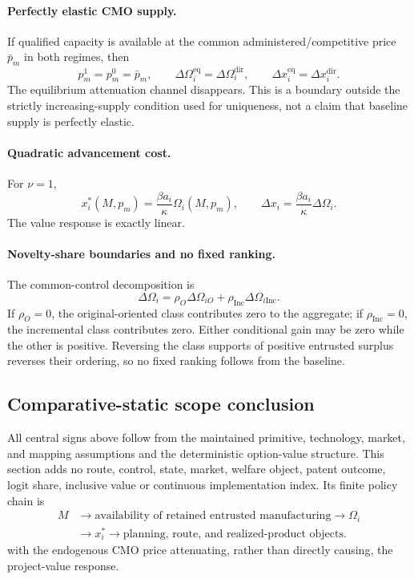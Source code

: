 \paragraph{Perfectly elastic CMO supply.}
If qualified capacity is available at the common administered/competitive
price \(\bar p_m\) in both regimes, then
\[
  p_m^1=p_m^0=\bar p_m,
  \qquad
  \Delta\Omega_i^{\mathrm{eq}}=\Delta\Omega_i^{\mathrm{dir}},
  \qquad
  \Delta x_i^{\mathrm{eq}}=\Delta x_i^{\mathrm{dir}}.
\]
The equilibrium attenuation channel disappears. This is a boundary outside
the strictly increasing-supply condition used for uniqueness, not a claim
that baseline supply is perfectly elastic.

\paragraph{Quadratic advancement cost.}
For \(\nu=1\),
\begin{equation}
  x_i^*(M,p_m)
  =
  \frac{\beta a_i}{\kappa}\Omega_i(M,p_m),
  \qquad
  \Delta x_i
  =
  \frac{\beta a_i}{\kappa}\Delta\Omega_i.
  \label{eq:p15-quadratic-boundary}
\end{equation}
The value response is exactly linear.

\paragraph{Novelty-share boundaries and no fixed ranking.}
The common-control decomposition is
\begin{equation}
  \Delta\Omega_i
  =
  \rho_O\Delta\Omega_{iO}
  +
  \rho_{\mathrm{Inc}}\Delta\Omega_{i\mathrm{Inc}}.
  \label{eq:p15-novelty-boundary}
\end{equation}
If \(\rho_O=0\), the original-oriented class contributes zero to the aggregate;
if \(\rho_{\mathrm{Inc}}=0\), the incremental class contributes zero. Either
conditional gain may be zero while the other is positive. Reversing the class
supports of positive entrusted surplus reverses their ordering, so no fixed
ranking follows from the baseline.

\subsection{Comparative-static scope conclusion}
\label{subsec:p15-scope}

All central signs above follow from the maintained primitive, technology,
market, and mapping assumptions and
the deterministic option-value structure. This section adds no route, control,
state, market, welfare object, patent outcome, logit share, inclusive value or
continuous implementation index. Its finite policy chain is
\[
  \begin{aligned}
  M
  &\longrightarrow
  \text{availability of retained entrusted manufacturing}
  \longrightarrow
  \Omega_i \\
  &\longrightarrow
  x_i^*
  \longrightarrow
  \text{planning, route, and realized-product objects}.
  \end{aligned}
\]
with the endogenous CMO price attenuating, rather than directly causing, the
project-value response.
